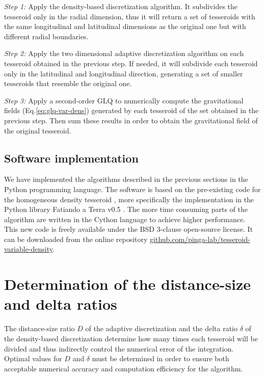 \documentclass[extra, referee]{gji}
\begin{document}
\textit{Step 1:}
Apply the density-based discretization algorithm.
It subdivides the tesseroid only in the radial dimension, thus it will return a set of
tesseroids with the same longitudinal and latitudinal dimensions as the original one but
with different radial boundaries.

\textit{Step 2:}
Apply the two dimensional adaptive discretization algorithm on each tesseroid obtained
in the previous step.
If needed, it will subdivide each tesseroid only in the latitudinal and longitudinal
direction, generating a set of smaller tesseroids that resemble the original one.

\textit{Step 3:}
Apply a second-order GLQ to numerically compute the gravitational fields
(Eq.\ref{eq:glq-var-dens}) generated by each tesseroid of the set obtained in the
previous step.
Then sum these results in order to obtain the gravitational field of the original
tesseroid.


\subsection{Software implementation}

We have implemented the algorithms described in the previous sections in the Python
programming language.
The software is based on the pre-existing code for the homogeneous density tesseroid
\citep{Uieda2016}, more specifically the implementation in the Python library Fatiando a
Terra v0.5 \citep{Uieda2013}.
The more time consuming parts of the algorithm are written in the Cython language to
achieve higher performance.
This new code is freely available under the BSD 3-clause open-source license.
It can be downloaded from the online repository
\href{https://github.com/pinga-lab/tesseroid-variable-density}{github.com/pinga-lab/tesseroid-variable-density}.




\section{Determination of the distance-size and delta ratios}

The distance-size ratio $D$ of the adaptive discretization and the delta ratio $\delta$
of the density-based discretization determine how many times each tesseroid will be
divided and thus indirectly control the numerical error of the integration.
Optimal values for $D$ and $\delta$ must be determined in order to ensure both
acceptable numerical accuracy and computation efficiency for the algorithm.
\end{document}
